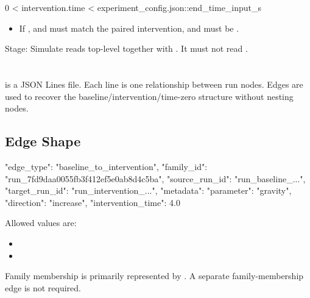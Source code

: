 \documentclass[11pt]{article}
\begin{document}
\begin{DocCode}
0 < intervention.time < experiment_config.json::end_time_input_s
\end{DocCode}

\begin{itemize}
\item If ,  and  must match the paired intervention, and  must be .
\end{itemize}

Stage: Simulate reads top-level  together with .
It must not read .

\section*{\texorpdfstring{}{run\_edges.jsonl}}
\label{sec:candidate-generation-run-edges}

 is a JSON Lines file.
Each line is one relationship between run nodes.
Edges are used to recover the baseline/intervention/time-zero structure without nesting nodes.

\subsection*{Edge Shape}

\begin{DocCode}
{
  "edge_type": "baseline_to_intervention",
  "family_id": "run_7fd9daa0055fb3f412ef5e0ab8d4c5ba",
  "source_run_id": "run_baseline_...",
  "target_run_id": "run_intervention_...",
  "metadata": {
    "parameter": "gravity",
    "direction": "increase",
    "intervention_time": 4.0
  }
}
\end{DocCode}

Allowed  values are:

\begin{itemize}
\item {}
\item {}
\end{itemize}

Family membership is primarily represented by .
A separate family-membership edge is not required.

\section*{\texorpdfstring{}{generation\_report.json}}
\end{document}

